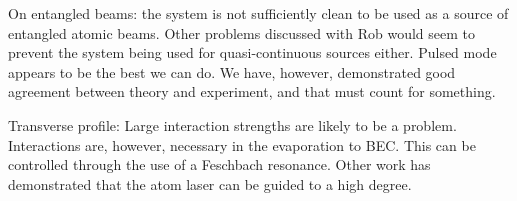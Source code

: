 On entangled beams: the system is not sufficiently clean to be used as a source of entangled atomic beams.  Other problems discussed with Rob would seem to prevent the system being used for quasi-continuous sources either.  Pulsed mode appears to be the best we can do.  We have, however, demonstrated good agreement between theory and experiment, and that must count for something.

Transverse profile:  Large interaction strengths are likely to be a problem.  Interactions are, however, necessary in the evaporation to BEC.  This can be controlled through the use of a Feschbach resonance.  Other work has demonstrated that the atom laser can be guided to a high degree.

